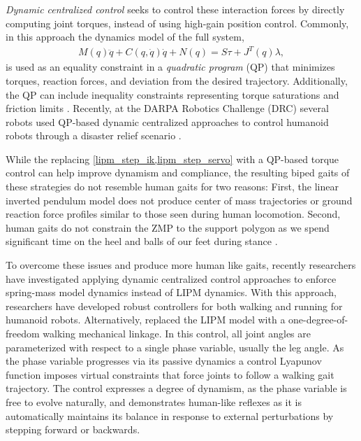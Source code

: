\emph{Dynamic centralized control} seeks to control these interaction forces by
directly computing joint torques, instead of using high-gain position control.
Commonly, in this approach the dynamics model of the full system,
\begin{align}
    M(q) \ddot{q} + C(q, \dot{q}) \dot{q} + N(q) = S\tau + J^T(q) \lambda,
    \label{eq:euler_lagrange}
\end{align}
is used as an equality constraint in a \emph{quadratic program} (QP) that
minimizes torques, reaction forces, and deviation from the desired
trajectory.  Additionally, the QP can include
inequality constraints representing torque saturations and friction limits
\citep{hutter2013hybrid, herzog2014balancing, saab2013dynamic,
wensing2013generation}. Recently, at the DARPA Robotics Challenge (DRC) several
robots used QP-based dynamic centralized approaches to control humanoid robots
through a disaster relief scenario \citep{feng2015optimization,
kuindersma2014efficiently, englsberger2014trajectory}. 

While the replacing \cref{lipm_step_ik,lipm_step_servo} with a QP-based torque
control can help improve dynamism and compliance, the resulting biped gaits of
these strategies do not resemble human gaits for two reasons: First, the linear
inverted pendulum model does not produce center of mass trajectories or ground
reaction force profiles similar to those seen during human locomotion.  Second,
human gaits do not constrain the ZMP to the support polygon as we spend
significant time on the heel and balls of our feet during stance
\citep{perry2010gait}.

To overcome these issues and produce more human like gaits, recently researchers
have investigated applying dynamic centralized control approaches to enforce
spring-mass model dynamics instead of LIPM dynamics. With this approach,
researchers have developed robust controllers for both walking
\citep{liu2016terrain} and running \citep{martin2015robust} for humanoid robots.
Alternatively, \citet{sreenath2011compliant} replaced the LIPM model with a
one-degree-of-freedom walking mechanical linkage. In this control, all joint
angles are parameterized with respect to a single phase variable, usually the
leg angle. As the phase variable progresses via its passive dynamics a control
Lyapunov function imposes virtual constraints that force joints to follow a
walking gait trajectory. The control expresses a degree of dynamism, as the
phase variable is free to evolve naturally, and demonstrates human-like reflexes
as it is automatically maintains its balance in response to external
perturbations by stepping forward or backwards.

